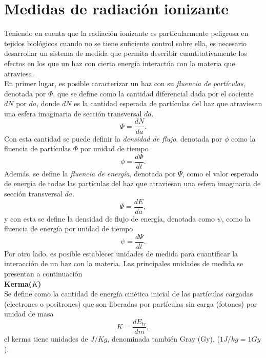 \section{Medidas de radiación ionizante}
Teniendo en cuenta que la radiación ionizante es particularmente peligrosa en tejidos biológicos cuando no se tiene suficiente control sobre ella, es necesario desarrollar un sistema de medida que permita describir cuantitativamente los efectos en los que un haz con cierta energía interactúa con la materia que atraviesa.\\

En primer lugar, es posible caracterizar un haz con su \textit{fluencia de partículas}, denotada por $\Phi $, que se define como la cantidad diferencial dada por el cociente $dN$ por $da$, donde $dN$ es la cantidad esperada de partículas del haz que atraviesan una esfera imaginaria de sección transversal $da$.
\begin{equation}
\Phi=\frac{dN}{da}.
\end{equation}   
Con esta cantidad se puede definir la \textit{densidad de flujo}, denotada por $\phi$ como la fluencia de partículas $\Phi$ por unidad de tiempo
\begin{equation}
\phi=\frac{d\Phi}{dt}.
\end{equation}
Además, se define la \textit{fluencia de energía}, denotada por $\Psi$, como el valor esperado de energía de todas las partículas del haz que atraviesan una esfera imaginaria de sección transversal $da$.
\begin{equation}
\Psi=\frac{dE}{da},
\end{equation}
y con esta se define la densidad de flujo de energía, denotada como $\psi$, como la fluencia de energía por unidad de tiempo
\begin{equation}
\psi=\frac{d\Psi}{dt}.
\end{equation}
Por otro lado, es posible establecer unidades de medida para cuantificar la interacción de un haz con la materia. Las principales unidades de medida se presentan a continuación\\

\noindent
\textbf{Kerma($K$)}\\

Se define como la cantidad de energía cinética inicial de las partículas cargadas (electrones o positrones) que son liberadas por partículas sin carga (fotones) por unidad de masa
\begin{equation}
K=\frac{dE_{tr}}{dm},
\end{equation}
el kerma tiene unidades de $J/Kg$, denominada también Gray (Gy), ($1J/kg=1Gy$).\\


